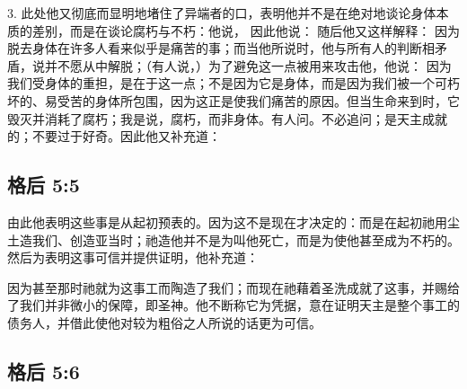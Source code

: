 3.  此处他又彻底而显明地堵住了异端者的口，表明他并不是在绝对地谈论身体本质的差别，而是在谈论腐朽与不朽：他说， 因此他说： 随后他又这样解释： 因为脱去身体在许多人看来似乎是痛苦的事；而当他所说时，他与所有人的判断相矛盾，说并不愿从中解脱；（有人说，）为了避免这一点被用来攻击他，他说： 因为我们受身体的重担，是在于这一点；不是因为它是身体，而是因为我们被一个可朽坏的、易受苦的身体所包围，因为这正是使我们痛苦的原因。但当生命来到时，它毁灭并消耗了腐朽；我是说，腐朽，而非身体。有人问。不必追问；是天主成就的；不要过于好奇。因此他又补充道：\par


\subsection{格后 5:5}

\par

由此他表明这些事是从起初预表的。因为这不是现在才决定的：而是在起初祂用尘土造我们、创造亚当时；祂造他并不是为叫他死亡，而是为使他甚至成为不朽的。然后为表明这事可信并提供证明，他补充道：\par

 因为甚至那时祂就为这事工而陶造了我们；而现在祂藉着圣洗成就了这事，并赐给了我们并非微小的保障，即圣神。他不断称它为凭据，意在证明天主是整个事工的债务人，并借此使他对较为粗俗之人所说的话更为可信。\par


\subsection{格后 5:6}

